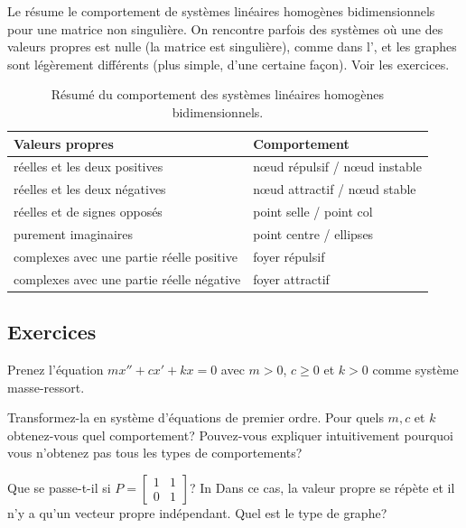 \medskip

Le  résume le comportement de systèmes linéaires homogènes bidimensionnels pour une matrice non singulière. On rencontre parfois des systèmes où une des valeurs propres est nulle (la matrice est singulière), comme dans l’, et les graphes sont légèrement différents (plus simple, d’une certaine façon). Voir les exercices.

\begin{table}[h!t]
\mybeginframe
\capstart
\begin{center}
\begin{tabular}{@{}ll@{}}
\toprule
Valeurs propres & Comportement \\
\midrule
réelles et les deux positives & nœud répulsif / nœud instable \\
réelles et les deux négatives & nœud attractif / nœud stable \\
réelles et de signes opposés & point selle / point col \\
purement imaginaires & point centre / ellipses \\
complexes avec une partie réelle positive & foyer répulsif \\
complexes avec une partie réelle négative & foyer attractif \\
\bottomrule
\end{tabular}
\end{center}
\caption{Résumé du comportement des systèmes linéaires homogènes bidimensionnels.\label{pln:behtab}}
\myendframe
\end{table}

\subsection{Exercices}

\begin{exercise}
Prenez l'équation $m x'' + c x' + kx = 0$ avec $m > 0$, $c \geq 0$ et $k > 0$
comme système masse-ressort.
\begin{tasks}
\task Transformez-la en système d'équations de premier ordre.
\task Pour quels $m, c$ et $k$ obtenez-vous quel comportement?
\task Pouvez-vous expliquer intuitivement pourquoi vous n’obtenez pas tous les types de comportements?
\end{tasks}
\end{exercise}

\begin{exercise}
Que se passe-t-il si $P = 
\left[ \begin{smallmatrix} 1 & 1 \\ 0 & 1 \end{smallmatrix} \right]$?  In
Dans ce cas, la valeur propre se répète et il n’y a qu’un vecteur propre indépendant.
Quel est le type de graphe?
\end{exercise}

